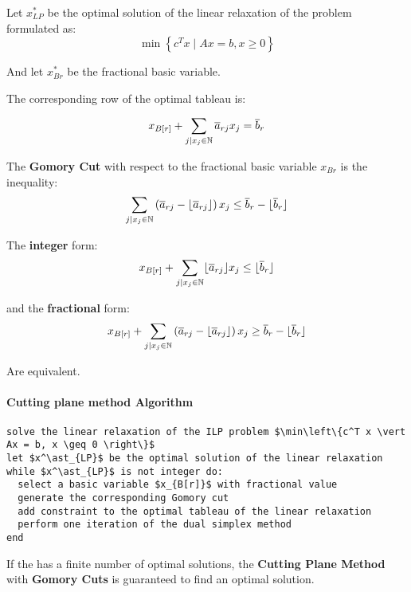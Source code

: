 \documentclass[english]{article}
\begin{document}
Let \(x^\ast_{LP}\) be the optimal solution of the linear relaxation of the \ILP problem formulated as:
\[ \min \left\{ c^T x \mid Ax = b, x \geq 0 \right\} \]

And let \(x^\ast_{B{r}}\) be the fractional basic variable.

The corresponding row of the optimal tableau is:

\[ x_{B[r]} + \displaystyle \sum_{j \vert x_j \in \mathbb{N}} \overline{a}_{rj} x_j = \overline{b}_r \]

\begin{definition}
  The \textbf{Gomory Cut} with respect to the fractional basic variable \(x_{B{r}}\) is the inequality:
  \[ \displaystyle \sum_{j \vert x_j \in \mathbb{N}} \left( \overline{a}_{rj} - \lfloor \overline{a}_{rj} \rfloor \right) x_j \leq \overline{b}_r - \lfloor \overline{b}_r \rfloor \]
\end{definition}

\begin{property}
  The \textbf{integer} form:
  \[ \displaystyle x_{B[r]} + \sum_{j \vert x_j \in \mathbb{N}} \lfloor\overline{a}_{rj}\rfloor x_j \leq \lfloor\overline{b}_r\rfloor \]

  and the \textbf{fractional} form:
  \[ \displaystyle x_{B[r]} + \sum_{j \vert x_j \in \mathbb{N}} \left( \overline{a}_{rj} - \lfloor \overline{a}_{rj} \rfloor \right) x_j \geq \overline{b}_r - \lfloor \overline{b}_r \rfloor \]

  Are equivalent.
\end{property}

\paragraph{Cutting plane method Algorithm}

\begin{lstlisting}[label={lst:cutting-plane-method-gomory}, caption={Cutting plane method with fractional Gomory Cuts}]
solve the linear relaxation of the ILP problem $\min\left\{c^T x \vert Ax = b, x \geq 0 \right\}$
let $x^\ast_{LP}$ be the optimal solution of the linear relaxation
while $x^\ast_{LP}$ is not integer do:
  select a basic variable $x_{B[r]}$ with fractional value
  generate the corresponding Gomory cut
  add constraint to the optimal tableau of the linear relaxation
  perform one iteration of the dual simplex method
end
\end{lstlisting}

\begin{theorem}
  If the \ILP has a finite number of optimal solutions, the \textbf{Cutting Plane Method} with \textbf{Gomory Cuts} is guaranteed to find an optimal solution.
\end{theorem}
\end{document}
